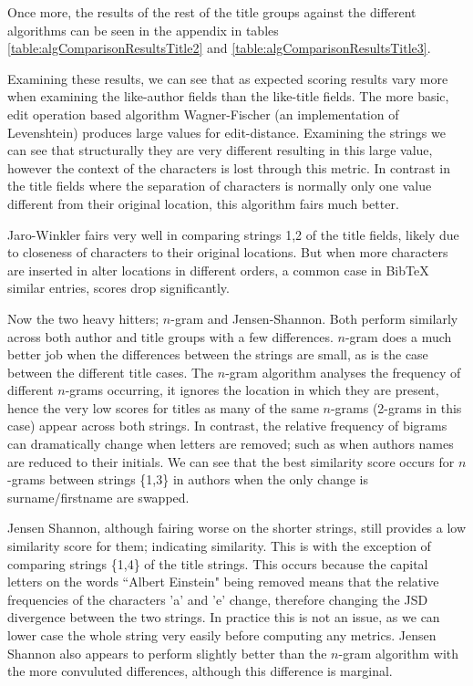\documentclass[a4paper,11pt]{article}
\begin{document}
Once more, the results of the rest of the title groups against the different algorithms can be seen in the appendix in tables \ref{table:algComparisonResultsTitle2} and \ref{table:algComparisonResultsTitle3}.

Examining these results, we can see that as expected scoring results vary more when examining the like-author fields than the like-title fields. The more basic, edit operation based algorithm Wagner-Fischer (an implementation of Levenshtein) produces large values for edit-distance. Examining the strings we can see that structurally they are very different resulting in this large value, however the context of the characters is lost through this metric. In contrast in the title fields where the separation of characters is normally only one value different from their original location, this algorithm fairs much better.

Jaro-Winkler fairs very well in comparing strings {1,2} of the title fields, likely due to closeness of characters to their original locations. But when more characters are inserted in alter locations in different orders, a common case in BibTeX similar entries, scores drop significantly.

Now the two heavy hitters; $n$-gram and Jensen-Shannon. Both perform similarly across both author and title groups with a few differences. $n$-gram does a much better job when the differences between the strings are small, as is the case between the different title cases. The $n$-gram algorithm analyses the frequency of different $n$-grams occurring, it ignores the location in which they are present, hence the very low scores for titles as many of the same $n$-grams (2-grams in this case) appear across both strings. In contrast, the relative frequency of bigrams can dramatically change when letters are removed; such as when authors names are reduced to their initials. We can see that the best similarity score occurs for $n$-grams between strings \{1,3\} in authors when the only change is surname/firstname are swapped.

Jensen Shannon, although fairing worse on the shorter strings, still provides a low similarity score for them; indicating similarity. This is with the exception of comparing strings \{1,4\} of the title strings. This occurs because the capital letters on the words ``Albert Einstein" being removed means that the relative frequencies of the characters 'a' and 'e' change, therefore changing the JSD divergence between the two strings. In practice this is not an issue, as we can lower case the whole string very easily before computing any metrics. Jensen Shannon also appears to perform slightly better than the $n$-gram algorithm with the more convuluted differences, although this difference is marginal.
\end{document}

